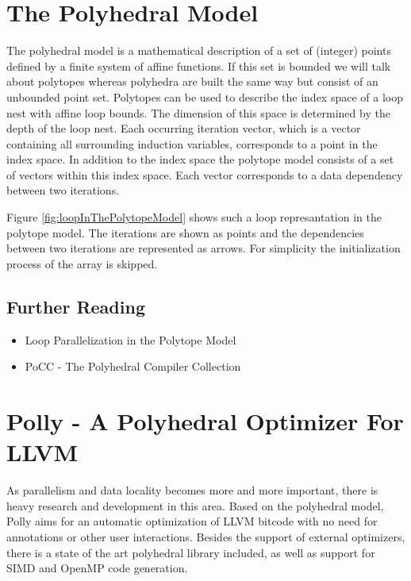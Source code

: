 \section{The Polyhedral Model}
The polyhedral model is a mathematical description of a set of (integer) points
defined by a finite system of affine functions. If this set is bounded we will
talk about polytopes whereas polyhedra are built the same way but consist of an
unbounded point set.
Polytopes can be used to describe the index space of a loop nest with 
affine loop bounds. The dimension of this space is determined by the depth of 
the loop nest. Each occurring iteration vector, which is a vector 
containing all surrounding induction variables, corresponds to a point in the 
index space. In addition to the index space the polytope model consists of a 
set of vectors within this index space. Each vector corresponds to a data
dependency between two iterations.

Figure \ref{fig:loopInThePolytopeModel} shows such a loop represantation in the 
polytope model. The iterations are shown as points and
the dependencies between two iterations are represented as arrows. 
For simplicity the initialization process of the array is skipped.

\subsection*{Further Reading}
\begin{itemize}
  \item Loop Parallelization in the Polytope Model \cite{Lengauer93loopparallelization}  
  \item PoCC - The Polyhedral Compiler Collection \cite{PoCC:Online}
\end{itemize}


\section{Polly - A Polyhedral Optimizer For LLVM}
\label{Polly}
As parallelism and data locality becomes more and more important, 
there is heavy research and development in this area.
Based on the polyhedral 
model, Polly aims for an automatic optimization of
LLVM bitcode with no need for annotations or other user interactions.
Besides the support of external optimizers, there is a 
state of the art polyhedral library included, as well as support for SIMD and 
OpenMP code generation\cite{raghesh2011framework}. 

